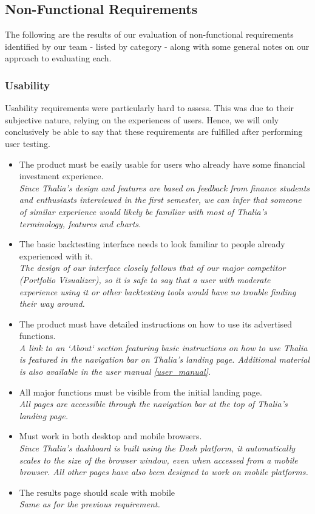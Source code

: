 \documentclass[main.tex]{subfiles}
\begin{document}
\subsection{Non-Functional Requirements}
The following are the results of our evaluation of non-functional requirements identified by our team - listed by category - along with some general notes on our approach to evaluating each.

\subsubsection{Usability}
Usability requirements were particularly hard to assess. This was due to their subjective nature, relying on the experiences of users. Hence, we will only conclusively be able to say that these requirements are fulfilled after performing user testing.

\begin{itemize}

    \item The product must be easily usable for users who already have some ﬁnancial investment experience.\\
    \textit{Since Thalia’s design and features are based on feedback from finance students and enthusiasts interviewed in the first semester, we can infer that someone of similar experience would likely be familiar with most of Thalia's terminology, features and charts.}
    \item The basic backtesting interface needs to look familiar to people already experienced with it. \\
    \textit{The design of our interface closely follows that of our major competitor (Portfolio Visualizer), so it is safe to say that a user with moderate experience using it or other backtesting tools would have no trouble finding their way around.}
    
    \item The product must have detailed instructions on how to use its advertised functions.\\
    \textit{A link to an `About` section featuring basic instructions on how to use Thalia is featured in the navigation bar on Thalia’s landing page. Additional material is also available in the user manual \ref{user_manual}.}
    \item All major functions must be visible from the initial landing page.\\
    \textit{All pages are accessible through the navigation bar at the top of Thalia’s landing page.}
    \item Must work in both desktop and mobile browsers.\\
    \textit{Since Thalia’s dashboard is built using the Dash platform, it automatically scales to the size of the browser window, even when accessed from a mobile browser. All other pages have also been designed to work on mobile platforms.}
    \item The results page should scale with mobile\\
    \textit{Same as for the previous requirement.}

\end{itemize}
\end{document}
